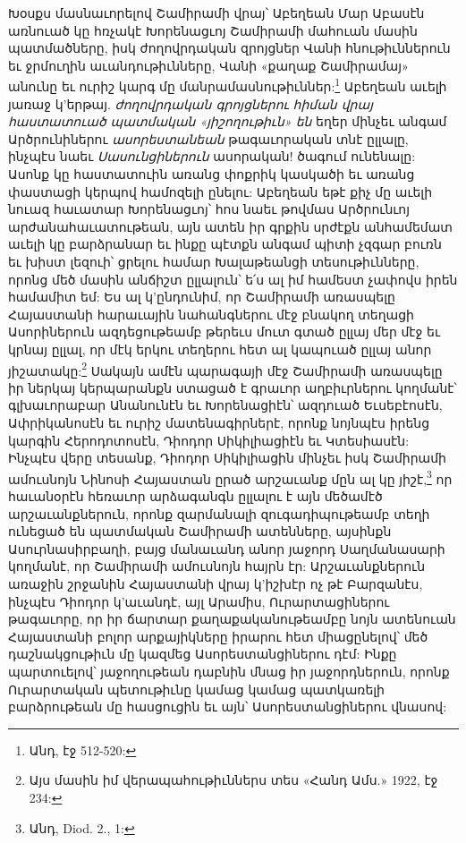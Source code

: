 \documentclass{article}
\begin{document}
{Խօսքս մասնաւորելով Շամիրամի վրայ՝ Աբեղեան Մար Աբասէն առնուած կը հռչակէ Խորենացւոյ Շամիրամի մահուան մասին պատմածները, իսկ ժողովրդական զրոյցներ Վանի հնութիւններուն եւ ջրմուղին աւանդութիւնները, Վանի «քաղաք Շամիրամայ» անունը եւ ուրիշ կարգ մը մանրամասնութիւններ:\footnote{Անդ, էջ 512-520:} Աբեղեան աւելի յառաջ կ'երթայ. \emph{ժողովրդական գրոյցներու հիման վրայ հաստատուած պատմական «յիշողութիւն» են} եղեր մինչեւ անգամ Արծրունիներու \emph{ասորեստանեան} թագաւորական տնէ ըլլալը, ինչպէս նաեւ \emph{Սասունցիներուն} ասորական! ծագում ունենալը: Ասոնք կը հաստատուին առանց փոքրիկ կասկածի եւ առանց փաստացի կերպով համոզելի ընելու: Աբեղեան եթէ քիչ մը աւելի նուազ հաւատար Խորենացւոյ՝ հոս նաեւ թովմաս Արծրունւոյ արժանահաւատութեան, այն ատեն իր գրքին սրժէքն անհամեմատ աւելի կը բարձրանար եւ ինքը պէտքն անգամ պիտի չզգար բուռն եւ խիստ լեզուի՝ ցրելու համար Խալաթեանցի տեսութիւնները, որոնց մեծ մասին անճիշտ ըլլալուն՝ ե՛ս ալ իմ համեստ չափովս իրեն համամիտ եմ: Ես ալ կ'ընդունիմ, որ Շամիրամի առասպելը Հայաստանի հարաւային նահանգներու մէջ բնակող տեղացի Ասորիներուն ազդեցութեամբ թերեւս մուտ գտած ըլլայ մեր մէջ եւ կրնայ ըլլալ, որ մէկ երկու տեղերու հետ ալ կապուած ըլլայ անոր յիշատակը:\footnote{Այս մասին իմ վերապահութիւններս տես «Հանդ Ամս.» 1922, էջ 234:} Սակայն ամէն պարագայի մէջ Շամիրամի առասպելը իր ներկայ կերպարանքն ստացած է գրաւոր աղբիւրներու կողմանէ՝ գլխաւորաբար Անանունէն եւ Խորենացիէն՝ ազդուած Եւսեբէոսէն, Ափրիկանոսէն եւ ուրիշ մատենագիրներէ, որոնք նոյնպէս իրենց կարգին Հերոդոտոսէն, Դիոդոր Սիկիլիացիէն եւ Կտեսիասէն: Ինչպէս վերը տեսանք, Դիոդոր Սիկիլիացին մինչեւ իսկ Շամիրամի ամուսնոյն Նինոսի Հայաստան ըրած արշաւանք մըն ալ կը յիշէ,\footnote{Անդ, Diod. 2., 1:} որ հաւանօրէն հեռաւոր արձագանգն ըլլալու է այն մեծամէծ արշաւանքներուն, որոնք զարմանալի զուգադիպութեամբ տեղի ունեցած են պատմական Շամիրամի ատենները, այսինքն Ասուրնասիրբաղի, բայց մանաւանդ անոր յաջորդ Սաղմանասարի կողմանէ, որ Շամիրամի ամուսնոյն հայրն էր: Արշաւանքներուն առաջին շրջանին Հայաստանի վրայ կ'իշխէր ոչ թէ Բարզանէս, ինչպէս Դիոդոր կ'աւանդէ, այլ Արամիս, Ուրարտացիներու թագաւորը, որ իր ճարտար քաղաքականութեամբը նոյն ատենուան Հայաստանի բոլոր արքայիկները իրարու հետ միացընելով՝ մեծ դաշնակցութիւն մը կազմեց Ասորեստանցիներու դէմ: Ինքը պարտուելով՝ յաջողութեան դաբնին մնաց իր յաջորդներուն, որոնք Ուրարտական պետութիւնը կամաց կամաց պատկառելի բարձրութեան մը հասցուցին եւ այն՝ Ասորեստանցիներու վնասով:

}
\end{document}
